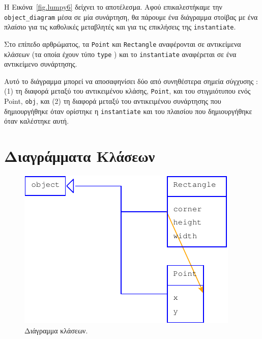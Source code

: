 \documentclass[10pt]{book}
\begin{document}
Η Εικόνα~\ref{fig.lumpy6} δείχνει το αποτέλεσμα.  Αφού επικαλεστήκαμε την  
\verb"object_diagram"  μέσα σε μία συνάρτηση, θα πάρουμε ένα διάγραμμα στοίβας 
με ένα πλαίσιο για τις καθολικές μεταβλητές και για τις επικλήσεις της  
{\tt instantiate}.

 Στο επίπεδο αρθρώματος, τα  {\tt Point}  και  {\tt Rectangle}  αναφέρονται σε αντικείμενα κλάσεων (τα οποία έχουν τύπο  {\tt type} ) και το 
 {\tt instantiate}  αναφέρεται σε ένα αντικείμενο συνάρτησης.

Αυτό το διάγραμμα μπορεί να αποσαφηνίσει δύο από συνηθέστερα σημεία σύγχυσης :  (1) τη διαφορά μεταξύ του αντικειμένου κλάσης,  {\tt Point},  και του στιγμιότυπου ενός  Point, {\tt obj},  και (2) τη διαφορά μεταξύ του αντικειμένου συνάρτησης που δημιουργήθηκε όταν ορίστηκε η  {\tt instantiate}  και του πλαισίου που δημιουργήθηκε όταν καλέστηκε αυτή.



\section{Διαγράμματα Κλάσεων}

\begin{figure}
\centerline
{\includegraphics[scale=0.7]{figs/lumpydemo7.pdf}}
\caption{Διάγραμμα κλάσεων.}
\label{fig.lumpy7}
\end{figure}
\end{document}
